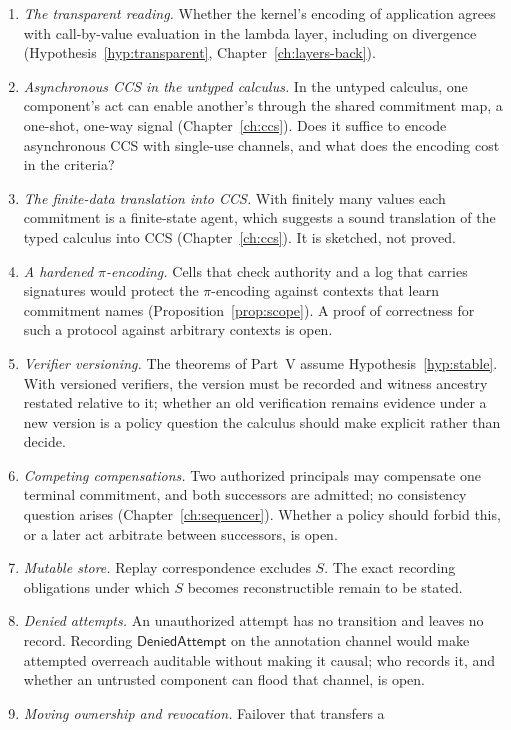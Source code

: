 \documentclass[11pt,openany]{book}
\theoremstyle{remark}
\begin{document}
\begin{enumerate}[leftmargin=1.5em]
\item \emph{The transparent reading.} Whether the kernel's encoding of
application agrees with call-by-value evaluation in the lambda layer,
including on divergence (Hypothesis~\ref{hyp:transparent},
Chapter~\ref{ch:layers-back}).
\item \emph{Asynchronous CCS in the untyped calculus.} In the untyped
calculus, one component's act can enable another's through the shared
commitment map, a one-shot, one-way signal (Chapter~\ref{ch:ccs}). Does
it suffice to encode asynchronous CCS with single-use channels, and what
does the encoding cost in the criteria?
\item \emph{The finite-data translation into CCS.} With finitely many
values each commitment is a finite-state agent, which suggests a sound
translation of the typed calculus into CCS (Chapter~\ref{ch:ccs}). It is
sketched, not proved.
\item \emph{A hardened $\pi$-encoding.} Cells that check authority and a
log that carries signatures would protect the $\pi$-encoding against
contexts that learn commitment names (Proposition~\ref{prop:scope}). A
proof of correctness for such a protocol against arbitrary contexts is
open.
\item \emph{Verifier versioning.} The theorems of Part~V assume
Hypothesis~\ref{hyp:stable}. With versioned verifiers, the version must be
recorded and witness ancestry restated relative to it; whether an old
verification remains evidence under a new version is a policy question the
calculus should make explicit rather than decide.
\item \emph{Competing compensations.} Two authorized principals may
compensate one terminal commitment, and both successors are admitted; no
consistency question arises (Chapter~\ref{ch:sequencer}). Whether a policy
should forbid this, or a later act arbitrate between successors, is open.
\item \emph{Mutable store.} Replay correspondence excludes $S$. The exact
recording obligations under which $S$ becomes reconstructible remain to
be stated.
\item \emph{Denied attempts.} An unauthorized attempt has no transition and
leaves no record. Recording $\mathsf{DeniedAttempt}$ on the annotation
channel would make attempted overreach auditable without making it causal;
who records it, and whether an untrusted component can flood that channel,
is open.
\item \emph{Moving ownership and revocation.} Failover that transfers a

\end{enumerate}
\end{document}
